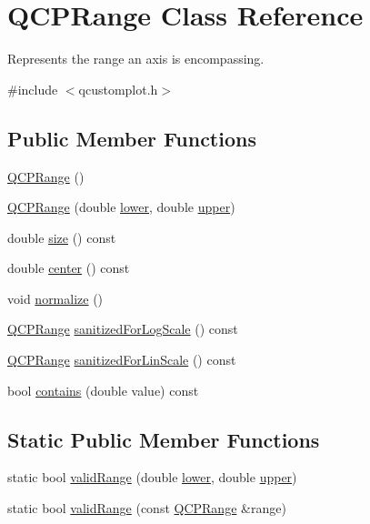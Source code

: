 \hypertarget{class_q_c_p_range}{\section{Q\-C\-P\-Range Class Reference}
\label{class_q_c_p_range}
}


Represents the range an axis is encompassing.  




{\ttfamily \#include $<$qcustomplot.\-h$>$}

\subsection*{Public Member Functions}
\begin{DoxyCompactItemize}
\item 
\hyperlink{class_q_c_p_range_aca158d7e69702cee5d77d10a269b01e2}{Q\-C\-P\-Range} ()
\item 
\hyperlink{class_q_c_p_range_a1d9d84d084c8f368fdedd42e0978d405}{Q\-C\-P\-Range} (double \hyperlink{class_q_c_p_range_aa3aca3edb14f7ca0c85d912647b91745}{lower}, double \hyperlink{class_q_c_p_range_ae44eb3aafe1d0e2ed34b499b6d2e074f}{upper})
\item 
double \hyperlink{class_q_c_p_range_afa57c13049b965edb6fd1c00ac56338a}{size} () const 
\item 
double \hyperlink{class_q_c_p_range_a3825b53cf17da5de0843c1f3baad07db}{center} () const 
\item 
void \hyperlink{class_q_c_p_range_af914a7740269b0604d0827c634a878a9}{normalize} ()
\item 
\hyperlink{class_q_c_p_range}{Q\-C\-P\-Range} \hyperlink{class_q_c_p_range_aaf6a9046e78d91eeb8e89584fe46b034}{sanitized\-For\-Log\-Scale} () const 
\item 
\hyperlink{class_q_c_p_range}{Q\-C\-P\-Range} \hyperlink{class_q_c_p_range_a1ff029704c29a75adbc1dc36cecaf44c}{sanitized\-For\-Lin\-Scale} () const 
\item 
bool \hyperlink{class_q_c_p_range_a030ce95b527c32e01414d0351347b46d}{contains} (double value) const 
\end{DoxyCompactItemize}
\subsection*{Static Public Member Functions}
\begin{DoxyCompactItemize}
\item 
static bool \hyperlink{class_q_c_p_range_ab38bd4841c77c7bb86c9eea0f142dcc0}{valid\-Range} (double \hyperlink{class_q_c_p_range_aa3aca3edb14f7ca0c85d912647b91745}{lower}, double \hyperlink{class_q_c_p_range_ae44eb3aafe1d0e2ed34b499b6d2e074f}{upper})
\item 
static bool \hyperlink{class_q_c_p_range_a801b964752eaad6219be9d8a651ec2b3}{valid\-Range} (const \hyperlink{class_q_c_p_range}{Q\-C\-P\-Range} \&range)
\end{DoxyCompactItemize}
